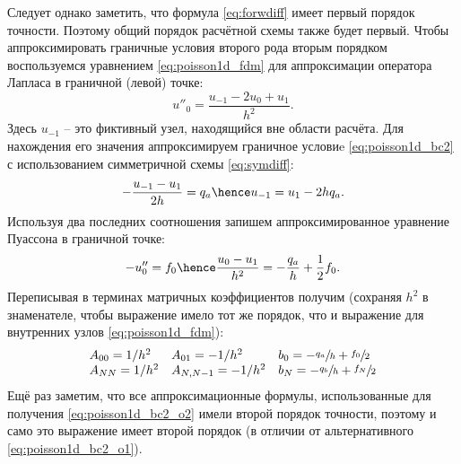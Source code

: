 Следует однако заметить, что формула \cref{eq:forwdiff} имеет первый порядок
точности. Поэтому общий порядок расчётной схемы также будет первый.
Чтобы аппроксимировать граничные условия второго рода вторым порядком
воспользуемся уравнением \cref{eq:poisson1d_fdm} для
аппроксимации оператора Лапласа в граничной (левой) точке:
\begin{equation*}
u''_0 = \frac{u_{-1} - 2 u_{0} + u_{1}}{h^2}.
\end{equation*}
Здесь $u_{-1}$ -- это фиктивный узел, находящийся вне области расчёта.
Для нахождения его значения
аппроксимируем граничное условиe \cref{eq:poisson1d_bc2}
с использованием симметричной схемы \cref{eq:symdiff}:
\begin{equation*}
-\frac{u_{-1} - u_{1}}{2h} = q_a \hence
u_{-1} = u_{1} - 2 h q_a.
\end{equation*}
Используя два последних соотношения
запишем аппроксимированное уравнение Пуассона в граничной точке:
\begin{equation}
\label{eq:poisson1d_bc2left_o2}
-u''_0 = f_0 \hence
\frac{u_{0} - u_{1}}{h^2} = -\frac{q_a}{h} + \frac{1}{2} f_0.
\end{equation}
Переписывая в терминах матричных коэффициентов получим (сохраняя $h^2$ в знаменателе, чтобы
выражение имело тот же порядок, что и выражение для внутренних узлов \cref{eq:poisson1d_fdm}):
\begin{equation}
\label{eq:poisson1d_bc2_o2}
\begin{array}{lll}
A_{00} = 1/h^2 & A_{01} = -1/h^2 & b_0 = -\sfrac{q_a}{h} + \sfrac{f_0}{2} \\
A_{NN} = 1/h^2 & A_{N,N-1} = -1/h^2 & b_N = -\sfrac{q_b}{h} + \sfrac{f_N}{2}
\end{array}
\end{equation}
Ещё раз заметим, что все аппроксимационные формулы,
использованные для получения \cref{eq:poisson1d_bc2_o2}
имели второй порядок точности, поэтому
и само это выражение имеет второй порядок (в отличии от альтернативного \cref{eq:poisson1d_bc2_o1}).


